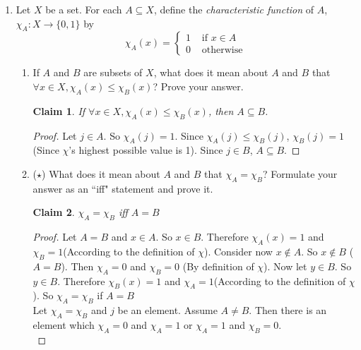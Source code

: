 \documentclass[11pt]{letter}
\newtheorem{claim}{Claim}
\theoremstyle{definition}
\begin{document}
\begin{enumerate}
\begin{enumerate}
\begin{proof}
                            So a downset is never empty.
                          \end{proof}
			\item For any $a,b\in A$, $D_a\subseteq D_b$ iff $a\vdash b$.
				\item Consider $\operatorname{Down}_{\vdash}=\left\{D_a\middle\vert a\in A\right\}$, the set of all downsets with respect to $\vdash$. Explain why $(A,\vdash)$ and $(\operatorname{Down}_{\vdash},\subseteq)$ have essentially the same structure.
			\end{enumerate}
		\item Let $X$ be a set. For each $A\subseteq X$, define the {\em characteristic function} of $A$,  $\chi_A:X\rightarrow \{0,1\}$ by $$\chi_A(x)=\begin{cases}1 &\text{ if } x\in A\\0&\text{ otherwise}\end{cases}$$ 
	\begin{enumerate}
	\item If $A$ and $B$ are subsets of $X$, what does it mean about $A$ and $B$ that $\forall x\in X, \chi_A(x)\leq \chi_B(x)$? Prove your answer.
          \begin{claim}
            If $\forall x\in X, \chi_A(x)\leq \chi_B(x)$, then $A\subseteq B$.
          \end{claim}
          \begin{proof}
            Let $j\in A$. So $\chi_A(j)=1$. Since $\chi_A(j)\leq \chi_B(j)$, $\chi_B(j)=1$ (Since $\chi$'s highest possible value is 1). Since $j\in B$, $A\subseteq B$. 
          \end{proof}
	\item ($\star$) What does it mean about $A$ and $B$ that  $\chi_A=\chi_B$? Formulate your answer as an ``iff" statement and prove it.
          \begin{claim}
            $\chi_A=\chi_B$ iff $A=B$           
          \end{claim}
          \begin{proof}
            Let $A=B$ and $x\in A$. So $x\in B$. Therefore $\chi_A(x)=1$ and $\chi_B=1$(According to the definition of $\chi$). Consider now $x\notin A$. So $x\notin B$ ($A=B$). Then $\chi_A=0$ and $\chi_B=0$ (By definition of $\chi$). Now let $y\in B$. So $y\in B$. Therefore $\chi_B(x)=1$ and $\chi_A=1$(According to the definition of $\chi$). So $\chi_A=\chi_B$ if $A=B$\\
            Let $\chi_A=\chi_B$ and $j$ be an element. Assume $A\neq B$. Then there is an element which $\chi_A=0$ and $\chi_A=1$ or $\chi_A=1$ and $\chi_B=0$.\\

\end{proof}
\end{enumerate}
\end{enumerate}
\end{document}
